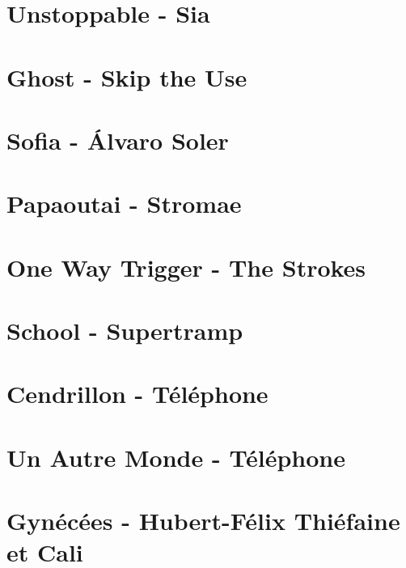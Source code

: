 \documentclass[11pt]{article}
\begin{document}
\section{Unstoppable - Sia}
\begin{guitar}

\end{guitar}

\section{Ghost - Skip the Use}


\section{Sofia - Álvaro Soler}
\begin{guitar}

\end{guitar}


\section{Papaoutai - Stromae}


\section{One Way Trigger - The Strokes}


\section{School - Supertramp}



\section{Cendrillon - Téléphone}
\begin{guitar}

\end{guitar}

\section*{Un Autre Monde - Téléphone}

\section{Gynécées - Hubert-Félix Thiéfaine et Cali}
\begin{guitar}

\end{guitar}
\end{document}
